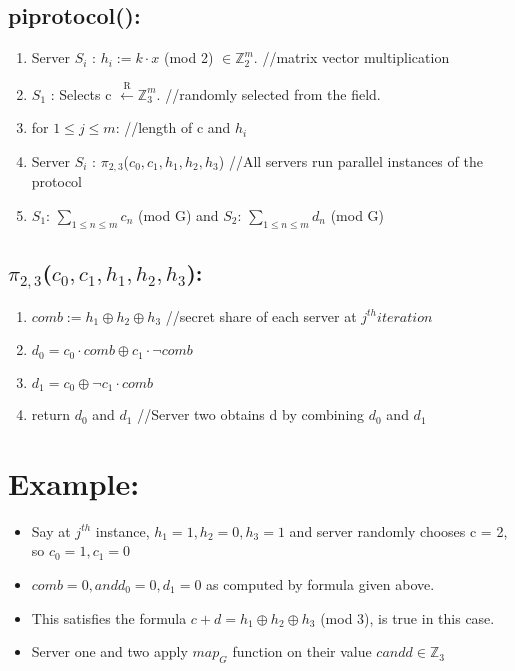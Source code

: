 \documentclass[11pt]{article}
\begin{document}
\subsection{piprotocol():}
\begin{enumerate}
	\item Server $S_{i}$ : $h_{i}  := k \cdot x  $ (mod 2) $\in \mathbb{Z}_{2}^{m}$. //matrix vector multiplication
	\item $S_{1}$ : Selects c $\xleftarrow{\text{R}} \mathbb{Z}_{3}^{m}$. //randomly selected from the field.
	\item for $1 \leq j \leq m$: //length of c and $h_{i}$
	\item \quad Server $S_{i}$ : $\pi_{2,3}$($c_{0}, c_{1}, h_{1}, h_{2}, h_{3}$) //All servers run parallel instances of the protocol
	\item $S_{1}$: $\sum_{1 \leq n \leq m} c_{n} $ (mod G) and $S_{2}$: $\sum_{1 \leq n \leq m} d_{n} $ (mod G)
\end{enumerate}

\subsection{$\pi_{2,3}$($c_{0}, c_{1}, h_{1}, h_{2}, h_{3}$):}
\begin{enumerate}
	\item $comb := h_{1} \oplus h_{2} \oplus h_{3}$ //secret share of each server at $j^{th} iteration$
	\item $d_{0} = c_{0} \cdot comb \oplus c_{1} \cdot \neg comb$
	\item $d_{1} = c_{0} \oplus \neg c_{1} \cdot comb$
	\item return $d_{0}$ and $d_{1}$ //Server two obtains d by combining $d_{0}$ and $d_{1}$
\end{enumerate}


\section{Example:}

\begin{itemize}
	\item Say at $j^{th}$ instance, $h_{1} = 1, h_{2} = 0, h_{3} = 1$ and server randomly chooses c = 2, so $c_{0} = 1, c_{1} = 0$
	\item $comb = 0, and d_{0} = 0, d_{1} = 0$ as computed by formula given above. 
	\item This satisfies the formula $c + d = h_{1} \oplus h_{2} \oplus h_{3}$ (mod 3), is true in this case.
	\item Server one and two apply $map_{G}$ function on their value $c and d \in \mathbb{Z}_3$
	
\end{itemize}
\end{document}
